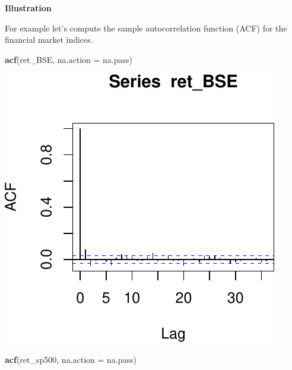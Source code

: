\documentclass[11pt,]{article}
\newenvironment{Shaded}{\begin{snugshade}}{\end{snugshade}}
\newcommand{\KeywordTok}[1]{\textcolor[rgb]{0.13,0.29,0.53}{\textbf{#1}}}
\newcommand{\DataTypeTok}[1]{\textcolor[rgb]{0.13,0.29,0.53}{#1}}
\newcommand{\NormalTok}[1]{#1}
\begin{document}
\textbf{Illustration}

For example let's compute the sample autocorrelation function (ACF) for
the financial market indices.

\begin{Shaded}
\begin{Highlighting}[]
\KeywordTok{acf}\NormalTok{(ret_BSE, }\DataTypeTok{na.action =}\NormalTok{ na.pass)}
\end{Highlighting}
\end{Shaded}

\begin{center}\includegraphics{FMC_T4_PhD_ARMA_GARCH_files/figure-latex/sample_ACF-1} \end{center}

\begin{Shaded}
\begin{Highlighting}[]
\KeywordTok{acf}\NormalTok{(ret_sp500, }\DataTypeTok{na.action =}\NormalTok{ na.pass)}
\end{Highlighting}
\end{Shaded}
\end{document}
